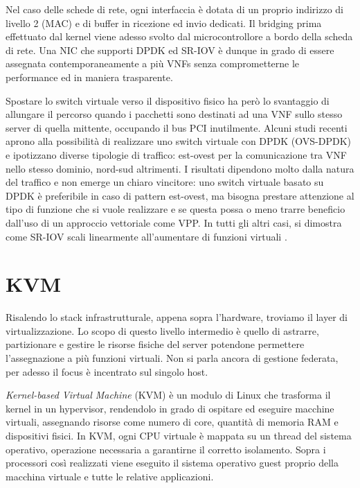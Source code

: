 Nel caso delle schede di rete, ogni interfaccia è dotata di un proprio indirizzo di livello 2 (MAC) e di buffer in ricezione ed invio dedicati. Il bridging prima effettuato dal kernel viene adesso svolto dal microcontrollore a bordo della scheda di rete. Una NIC che supporti DPDK ed SR-IOV è dunque in grado di essere assegnata contemporaneamente a più VNFs senza comprometterne le performance ed in maniera trasparente.

Spostare lo switch virtuale verso il dispositivo fisico ha però lo svantaggio di allungare il percorso quando i pacchetti sono destinati ad una VNF sullo stesso server di quella mittente, occupando il bus PCI inutilmente. Alcuni studi recenti aprono alla possibilità di realizzare uno switch virtuale con DPDK (OVS-DPDK) e ipotizzano diverse tipologie di traffico: est-ovest per la comunicazione tra VNF nello stesso dominio, nord-sud altrimenti. I risultati dipendono molto dalla natura del traffico e non emerge un chiaro vincitore: uno switch virtuale basato su DPDK è preferibile in caso di pattern est-ovest, ma bisogna prestare attenzione al tipo di funzione che si vuole realizzare e se questa possa o meno trarre beneficio dall'uso di un approccio vettoriale come VPP. In tutti gli altri casi, si dimostra come SR-IOV scali linearmente all'aumentare di funzioni virtuali \cite{intel-sriov, cisco-sriov}.

\section{KVM}

Risalendo lo stack infrastrutturale, appena sopra l'hardware, troviamo il layer di virtualizzazione. Lo scopo di questo livello intermedio è quello di astrarre, partizionare e gestire le risorse fisiche del server potendone permettere l'assegnazione a più funzioni virtuali. Non si parla ancora di gestione federata, per adesso il focus è incentrato sul singolo host.

\textit{Kernel-based Virtual Machine} (KVM) è un modulo di Linux che trasforma il kernel in un hypervisor, rendendolo in grado di ospitare ed eseguire macchine virtuali, assegnando risorse come numero di core, quantità di memoria RAM e dispositivi fisici. In KVM, ogni CPU virtuale è mappata su un thread del sistema operativo, operazione necessaria a garantirne il corretto isolamento. Sopra i processori così realizzati viene eseguito il sistema operativo guest proprio della macchina virtuale e tutte le relative applicazioni.

